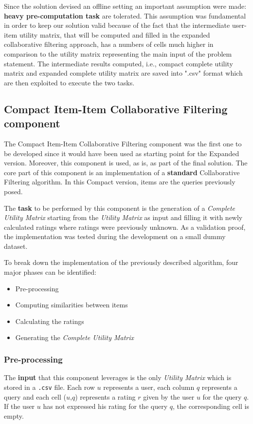 Since the solution devised an offline setting an important assumption were made: \textbf{heavy pre-computation task} are tolerated. This assumption was fundamental in order to keep our solution valid because of the fact that the intermediate user-item utility matrix, that will be computed and filled in the expanded collaborative filtering approach, has a numbers of cells much higher in comparison to the utility matrix representing the main input of the problem statement.
The intermediate results computed, i.e., compact complete utility matrix and expanded complete utility matrix are saved into ".csv" format which are then exploited to execute the two tasks.





\subsection{Compact Item-Item Collaborative Filtering component}
\label{sec:compact-item-item-cf-solution}
The Compact Item-Item Collaborative Filtering component was the first one to be developed since it would have been used as starting point for the Expanded version. 
Moreover, this component is used, as is, as part of the final solution.
The core part of this component is an implementation of a \textbf{standard} Collaborative Filtering algorithm. 
In this Compact version, items are the queries previously posed.

The \textbf{task} to be performed by this component is the generation of a \textit{Complete Utility Matrix} starting from the \textit{Utility Matrix} as input and filling it with newly calculated ratings where ratings were previously unknown.
As a validation proof, the implementation was tested during the development on a small dummy dataset.

To break down the implementation of the previously described algorithm, four major phases can be identified:
\begin{itemize}
    \item Pre-processing
    \item Computing similarities between items
    \item Calculating the ratings
    \item Generating the \textit{Complete Utility Matrix}
\end{itemize}


\subsubsection{Pre-processing}
The \textbf{input} that this component leverages is the only \textit{Utility Matrix} which is stored in a \verb+.csv+ file.
Each row $u$ represents a user, each column $q$ represents a query and each cell ($u$,$q$) represents a rating $r$ given by the user $u$ for the query $q$. If the user $u$ has not expressed his rating for the query $q$, the corresponding cell is empty. 

